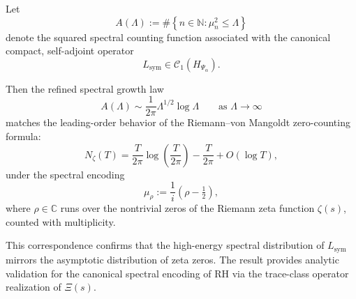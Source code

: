 \begin{corollary}
\label{cor:zeta-compatibility}
Let
\[
A(\Lambda) := \#\left\{ n \in \mathbb{N} : \mu_n^2 \le \Lambda \right\}
\]
denote the squared spectral counting function associated with the canonical compact, self-adjoint operator
\[
L_{\mathrm{sym}} \in \mathcal{C}_1(H_{\Psi_\alpha}).
\]

Then the refined spectral growth law
\[
A(\Lambda) \sim \frac{1}{2\pi} \Lambda^{1/2} \log \Lambda \qquad \text{as } \Lambda \to \infty
\]
matches the leading-order behavior of the Riemann–von Mangoldt zero-counting formula:
\[
N_\zeta(T) = \frac{T}{2\pi} \log\left( \frac{T}{2\pi} \right) - \frac{T}{2\pi} + O(\log T),
\]
under the spectral encoding
\[
\mu_\rho := \frac{1}{i} \left( \rho - \tfrac{1}{2} \right),
\]
where \( \rho \in \mathbb{C} \) runs over the nontrivial zeros of the Riemann zeta function \( \zeta(s) \), counted with multiplicity.

\medskip
\noindent
This correspondence confirms that the high-energy spectral distribution of \( L_{\mathrm{sym}} \) mirrors the asymptotic distribution of zeta zeros. The result provides analytic validation for the canonical spectral encoding of RH via the trace-class operator realization of \( \Xi(s) \).
\end{corollary}
